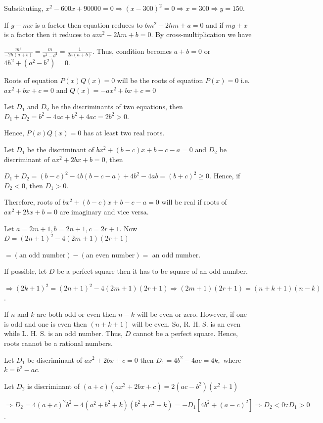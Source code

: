  Substituting, $x^2 - 600x + 90000 = 0\Rightarrow (x - 300)^2 = 0 \Rightarrow x = 300 \Rightarrow y = 150$.
\item If $y - mx$ is a factor then equation reduces to $bm^2 + 2hm + a = 0$ and if $my + x$ is a factor then
  it reduces to $am^2 - 2hm + b = 0$. By cross-multiplication we have

  $\frac{m^2}{-2h(a + b)} = \frac{m}{a^2 - b^2} = \frac{1}{2h(a + b)}$. Thus, condition becomes $a + b = 0$
  or $4h^2 + (a^2 - b^2) = 0$.
\item Roots of equation $P(x)Q(x) = 0$ will be the roots of equation $P(x) = 0$ i.e. $ax^2 + bx + c = 0$
  and $Q(x) = -ax^2 + bx + c = 0$

  Let $D_1$ and $D_2$ be the discriminants of two equations, then $D_1 + D_2 = b^2 - 4ac + b^2 + 4ac = 2b^2
  > 0$.

  Hence, $P(x)Q(x) = 0$ has at least two real roots.
\item Let $D_1$ be the discriminant of $bx^2 + (b - c)x + b - c - a = 0$ and $D_2$ be discriminant of
  $ax^2 + 2bx + b = 0$, then

  $D_1 + D_2 = (b - c)^2 - 4b(b - c - a) + 4b^2 - 4ab = (b + c)^2 \ge 0$. Hence, if $D_2 < 0$, then $D_1 >
  0$.

  Therefore, roots of $bx^2 + (b - c)x + b - c - a = 0$ will be real if roots of $ax^2 + 2bx + b = 0$ are
  imaginary and vice versa.
\item Let $a = 2m + 1, b = 2n + 1, c = 2r + 1$. Now $D = (2n + 1)^2 - 4(2m + 1)(2r + 1)$

  $= (\text{an odd number}) - (\text{an even number}) =$ an odd number.

  If possible, let $D$ be a perfect square then it has to be square of an odd number.

  $\Rightarrow (2k + 1)^2 = (2n + 1)^2 - 4(2m + 1)(2r + 1)\Rightarrow (2m + 1)(2r + 1) = (n + k + 1)(n - k)$.

  If $n$ and $k$ are both odd or even then $n - k$ will be even or zero. However, if one is odd and
  one is even then $(n + k + 1)$ will be even. So, R. H. S. is an even while L. H. S. is an odd number. Thus,
  $D$ cannot be a perfect square. Hence, roots cannot be a rational numbers.
\item Let $D_1$ be discriminant of $ax^2 + 2bx + c = 0$ then $D_1 = 4b^2 - 4ac = 4k,$ where $k = b^2 - ac$.

  Let $D_2$ is discriminant of $(a + c)(ax^2 + 2bx + c) = 2(ac - b^2)(x^2 + 1)$

  $\Rightarrow D_2 = 4(a + c)^2b^2 - 4(a^2 + b^2 + k)(b^2 + c^2 + k) = -D_1[4b^2 + (a - c)^2] \Rightarrow D_2
  < 0 \because D_1 > 0$.


